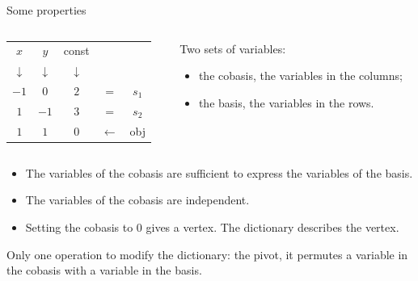 \begin{frame}{Some properties}
\begin{columns}[c]
\begin{column}{5cm}
\begin{tabular}{| c | c || c || c c |}
	\hline	
	$x$ & $y$ & const & & \\
	$\downarrow$ &$\downarrow$ &$\downarrow$ & & \\
	\hline
	\hline	
   	$-1$ & $0$ & $2$ & = & $s_1$\\ \hline	
   	$1$ & $-1$ & $3$ & = & $s_2$\\ \hline \hline	
   	$1$ & $1$ & $0$ & $\leftarrow$ & obj \\
   	\hline	
\end{tabular}
\end{column}
\begin{column}{5cm}
Two sets of variables:
\begin{itemize}
\item the cobasis, the variables in the columns;
\item the basis, the variables in the rows.
\end{itemize}
\end{column}
\end{columns}
\vspace*{0.5cm}
\begin{itemize}
\item The variables of the cobasis are sufficient to express the variables of the basis.
\item The variables of the cobasis are independent.
\item Setting the cobasis to $0$ gives a vertex. The dictionary describes the vertex.
\end{itemize}

Only one operation to modify the dictionary: the pivot, it permutes a variable in the cobasis with a variable in the basis.
\end{frame}

